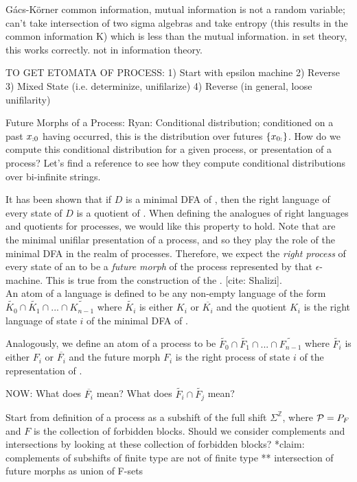 \documentclass[prl,twocolumn,showpacs,superscriptaddress,preprintnumbers,floatfix]{revtex4-1}
\begin{document}
G{\'a}cs-K{\"o}rner common information, mutual information is not a random variable; can't take intersection of two sigma algebras and take entropy (this results in the common information K) which is less than the mutual information. in set theory, this works correctly. not in information theory.

TO GET ETOMATA OF PROCESS:
1) Start with epsilon machine
2) Reverse
3) Mixed State (i.e. determinize, unifilarize)
4) Reverse (in general, loose unifilarity)

Future Morphs of a Process: Ryan: Conditional distribution; conditioned on a
past ${x}_{:0}$ having occurred, this is the distribution over futures $\{
{x}_{0:}\}$. How do we compute this conditional distribution for a given
process, or presentation of a process? Let's find a reference to see how they
compute conditional distributions over bi-infinite strings.

It has been shown that if $D$ is a minimal DFA of \Language, then the right
language of every state of $D$ is a quotient of \Language.  When defining the
analogues of right languages and quotients for processes, we would like this
property to hold.  Note that \eM are the minimal unifilar
presentation of a process, and so they play the role of the minimal DFA in the
realm of processes.  Therefore, we expect the \emph{right process} of every
state of an \eM to be a \emph{future morph} of the process
represented by that $\epsilon$-machine.  This is true from the construction of
the \eM. [cite: Shalizi]. \\ An atom of a language \Language is
defined to be any non-empty language of the form $\widetilde{K_0} \cap
\widetilde{K_1} \cap ... \cap \widetilde{K_{n-1}}$ where $\widetilde{K_i}$ is
either $K_i$ or $\overline{K_i}$ and the quotient $K_i$ is the right language of
state $i$ of the minimal DFA of \Language.

Analogously, we define an atom of a process \Process to be $\widetilde{F_0} \cap
\widetilde{F_1} \cap ... \cap \widetilde{F_{n-1}}$ where $\widetilde{F_i}$ is
either $F_i$ or $\overline{F_i}$ and the future morph $F_i$ is the right process
of state $i$ of the \eM representation of \Process.

NOW: What does $\overline{F_i}$ mean? What does $\widetilde{F_i} \cap
\widetilde{F_j}$ mean?

Start from definition of a process \Process as a subshift of the full shift
$\Sigma^{\mathbb{Z}}$, where $\mathcal{P} = P_{F}$ and $F$ is the collection of
forbidden blocks.  Should we consider complements and intersections by looking
at these collection of forbidden blocks? *claim: complements of subshifts of
finite type are not of finite type ** intersection of future morphs as union of
F-sets
\end{document}
